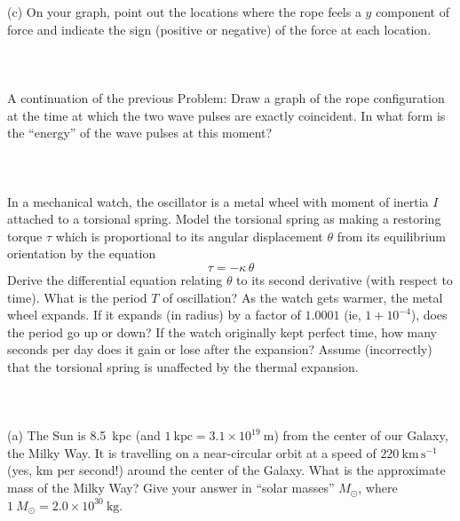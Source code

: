\documentclass[12pt]{article}
\newcounter{problem}
\begin{document}
(c) On your graph, point out the locations where the rope feels a $y$
component of force and indicate the sign (positive or negative) of the
force at each location.

\paragraph{\problemname~\theproblem}

A continuation of the previous Problem: Draw a graph of the rope
configuration at the time at which the two wave pulses are exactly
coincident.  In what form is the ``energy'' of the wave pulses at this
moment?

\paragraph{\problemname~\theproblem}

In a mechanical watch, the oscillator is a metal wheel with moment of
inertia $I$ attached to a torsional spring.  Model the torsional
spring as making a restoring torque $\tau$ which is proportional to
its angular displacement $\theta$ from its equilibrium orientation by
the equation
\begin{equation}
\tau = -\kappa\,\theta \nonumber
\end{equation}
Derive the differential equation relating $\theta$ to its second
derivative (with respect to time).  What is the period $T$ of
oscillation?  As the watch gets warmer, the metal wheel expands.  If
it expands (in radius) by a factor of $1.0001$ (ie, $1+10^{-4}$), does
the period go up or down?  If the watch originally kept perfect time,
how many seconds per day does it gain or lose after the expansion?
Assume (incorrectly) that the torsional spring is unaffected by the
thermal expansion.

\paragraph{\problemname~\theproblem}

(a) The Sun is 8.5~kpc (and $1~\mathrm{kpc}=3.1\times
10^{19}~\mathrm{m}$) from the center of our Galaxy, the Milky Way.  It
is travelling on a near-circular orbit at a speed of
$220~\mathrm{km\,s^{-1}}$ (yes, km per second!) around the center of
the Galaxy.  What is the approximate mass of the Milky Way?  Give your
answer in ``solar masses'' $M_\odot$, where $1~M_\odot= 2.0\times
10^{30}~\mathrm{kg}$.
\end{document}
